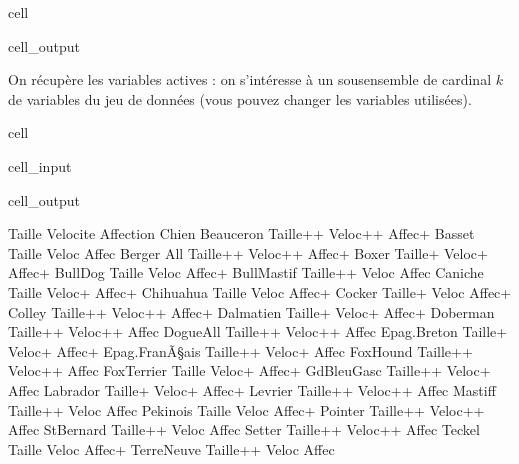 \documentclass[letterpaper,10pt,french]{sphinxmanual}
\begin{document}
\begin{sphinxuseclass}{cell}
\begin{sphinxuseclass}{cell_output}
\end{sphinxuseclass}
\end{sphinxuseclass}
\sphinxAtStartPar
On récupère les variables actives : on s’intéresse à un sous\sphinxhyphen{}ensemble de cardinal \(k\) de variables du jeu de données (vous pouvez changer les variables utilisées).

\begin{sphinxuseclass}{cell}
\begin{sphinxuseclass}{cell_input}
\begin{sphinxVerbatim}[commandchars=\\\{\}]
  \PYG{p}{[}\PYG{p}{[}\PYG{p}{]}\PYG{p}{]} 

\end{sphinxVerbatim}

\end{sphinxuseclass}
\begin{sphinxuseclass}{cell_output}
\begin{sphinxVerbatim}[commandchars=\\\{\}]
                   Taille Velocite Affection
Chien                                       
Beauceron        Taille++  Veloc++    Affec+
Basset            Taille\PYGZhy{}   Veloc\PYGZhy{}    Affec\PYGZhy{}
Berger All       Taille++  Veloc++    Affec+
Boxer             Taille+   Veloc+    Affec+
Bull\PYGZhy{}Dog          Taille\PYGZhy{}   Veloc\PYGZhy{}    Affec+
Bull\PYGZhy{}Mastif      Taille++   Veloc\PYGZhy{}    Affec\PYGZhy{}
Caniche           Taille\PYGZhy{}   Veloc+    Affec+
Chihuahua         Taille\PYGZhy{}   Veloc\PYGZhy{}    Affec+
Cocker            Taille+   Veloc\PYGZhy{}    Affec+
Colley           Taille++  Veloc++    Affec+
Dalmatien         Taille+   Veloc+    Affec+
Doberman         Taille++  Veloc++    Affec\PYGZhy{}
Dogue\PYGZhy{}All        Taille++  Veloc++    Affec\PYGZhy{}
Epag.\PYGZhy{}Breton      Taille+   Veloc+    Affec+
Epag.\PYGZhy{}FranÃ\S{}ais  Taille++   Veloc+    Affec\PYGZhy{}
Fox\PYGZhy{}Hound        Taille++  Veloc++    Affec\PYGZhy{}
Fox\PYGZhy{}Terrier       Taille\PYGZhy{}   Veloc+    Affec+
Gd\PYGZhy{}Bleu\PYGZhy{}Gasc     Taille++   Veloc+    Affec\PYGZhy{}
Labrador          Taille+   Veloc+    Affec+
Levrier          Taille++  Veloc++    Affec\PYGZhy{}
Mastiff          Taille++   Veloc\PYGZhy{}    Affec\PYGZhy{}
Pekinois          Taille\PYGZhy{}   Veloc\PYGZhy{}    Affec+
Pointer          Taille++  Veloc++    Affec\PYGZhy{}
St\PYGZhy{}Bernard       Taille++   Veloc\PYGZhy{}    Affec\PYGZhy{}
Setter           Taille++  Veloc++    Affec\PYGZhy{}
Teckel            Taille\PYGZhy{}   Veloc\PYGZhy{}    Affec+
Terre\PYGZhy{}Neuve      Taille++   Veloc\PYGZhy{}    Affec\PYGZhy{}
\end{sphinxVerbatim}

\end{sphinxuseclass}
\end{sphinxuseclass}
\end{document}
